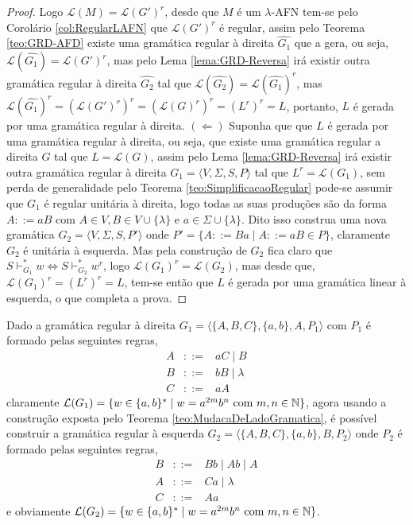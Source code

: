 \begin{proof}
	Logo $\mathcal{L}(M) = \mathcal{L}(G')^r$, desde que $M$ é um $\lambda$-AFN tem-se pelo Corolário \ref{col:RegularLAFN} que $\mathcal{L}(G')^r$ é regular, assim pelo Teorema \ref{teo:GRD-AFD} existe uma gramática regular à direita $\hat{G_1}$ que a gera, ou seja, $\mathcal{L}(\hat{G_1}) = \mathcal{L}(G')^r$, mas pelo Lema \ref{lema:GRD-Reversa} irá existir outra gramática regular à direita $\hat{G_2}$ tal que $\mathcal{L}(\hat{G_2}) = \mathcal{L}(\hat{G_1})^r$, mas $ \mathcal{L}(\hat{G_1})^r = (\mathcal{L}(G')^r)^r = (\mathcal{L}(G)^r)^r = (L^r)^r = L$, portanto, $L$ é gerada por uma gramática regular à direita. $(\Leftarrow)$ Suponha que que $L$ é gerada por uma gramática regular à direita, ou seja, que existe uma gramática regular a direita $G$ tal que $L = \mathcal{L}(G)$, assim pelo Lema \ref{lema:GRD-Reversa} irá existir outra gramática regular à direita $G_1 = \langle V, \Sigma, S, P \rangle$ tal que $L^r = \mathcal{L}(G_1)$, sem perda de generalidade pelo Teorema \ref{teo:SimplificacaoRegular} pode-se assumir que $G_1$ é regular unitária à direita, logo todas as suas produções são da forma $A ::= aB$ com $A \in V, B \in V \cup \{\lambda\}$ e $a \in \Sigma \cup \{\lambda\}$. Dito isso construa uma nova gramática $G_2 = \langle V, \Sigma, S, P'\rangle$ onde $P' = \{A ::= Ba \mid A ::= aB \in P\}$, claramente $G_2$ é unitária à esquerda. Mas pela construção de $G_2$ fica claro que $S \vdash_{G_1}^* w \Longleftrightarrow S \vdash_{G_2}^* w^r$, logo $\mathcal{L}(G_1)^r = \mathcal{L}(G_2)$, mas desde que, $\mathcal{L}(G_1)^r = (L^r)^r = L$, tem-se então que $L$ é gerada por uma gramática linear à esquerda, o que completa  a prova.
\end{proof}

\begin{exemplo}
	Dado a gramática regular à direita $G_1 = \langle \{A, B, C\}, \{a, b\}, A, P_1 \rangle$ com $P_1$ é formado pelas seguintes regras,
	\begin{eqnarray*}
		A & ::= & aC \mid B \\
		B & ::= & bB \mid \lambda\\
		C & ::= & aA
	\end{eqnarray*}
	 claramente $\mathcal{L}(G_1) = \{w \in \{a, b\}^* \mid w = a^{2m}b^n \hbox{ com } m,n \in \mathbb{N}\}$,  agora usando a construção exposta pelo Teorema \ref{teo:MudacaDeLadoGramatica}, é possível construir a gramática regular à esquerda $G_2 = \langle \{A, B, C\}, \{a, b\}, B, P_2 \rangle$ onde $P_2$ é formado pelas seguintes regras,
	 \begin{eqnarray*}
	 	B & ::= & Bb \mid Ab \mid A\\
	 	A & ::= & Ca \mid \lambda\\
	 	C & ::= & Aa 
	 \end{eqnarray*}
	 e obviamente $\mathcal{L}(G_2) = \{w \in \{a, b\}^* \mid w = a^{2m}b^n \hbox{ com } m,n \in \mathbb{N}\}$.
\end{exemplo}

